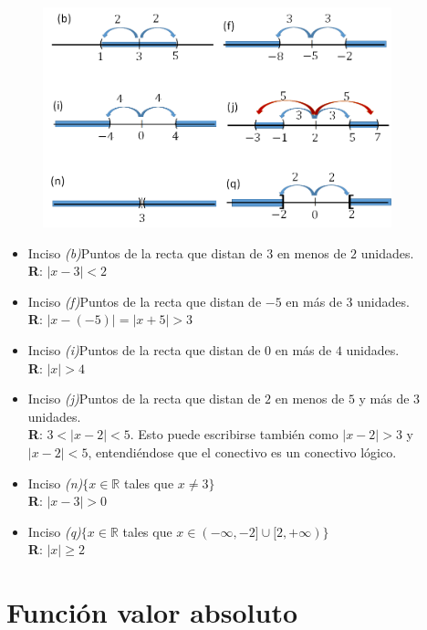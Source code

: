 \documentclass[12pt]{article}
\theoremstyle{definition}
\begin{document}
\begin{enumerate}
\begin{figure}[H]
\centering
\includegraphics[width=0.9\textwidth]{23.png}
\end{figure}
\begin{itemize}
\setlength\itemsep{0em}
\item Inciso \textit{(b)}Puntos de la recta que distan de $3$ en menos de $2$ unidades.\\
\textbf{R}: $|x-3| < 2$
\item Inciso \textit{(f)}Puntos de la recta que distan de $-5$ en más de $3$ unidades.\\
\textbf{R}:  $|x-(-5)| =  |x+5|>3 $
\item Inciso \textit{(i)}Puntos de la recta que distan de $0$ en más de $4$ unidades.\\
\textbf{R}:  $|x| >4$
\item Inciso \textit{(j)}Puntos de la recta que distan de $2$ en  menos de  $5$ y más de $3$ unidades.\\
\textbf{R}:  $3< |x-2| < 5$. Esto puede escribirse también como  $|x-2| >3$ y  $|x-2| < 5$, entendiéndose que el conectivo es un conectivo lógico.
\item Inciso \textit{(n)}$\{ x \in \mathbb{R}$ tales  que $x \neq 3\}$\\
\textbf{R}:  $|x-3| >0$
\item Inciso \textit{(q)}$\{ x \in \mathbb{R}$ tales  que $x \in (- \infty, -2] \cup [2, +\infty)\}$\\
\textbf{R}:  $|x| \geq 2$
\end{itemize}



\section{Función valor absoluto}


\end{enumerate}
\end{document}
